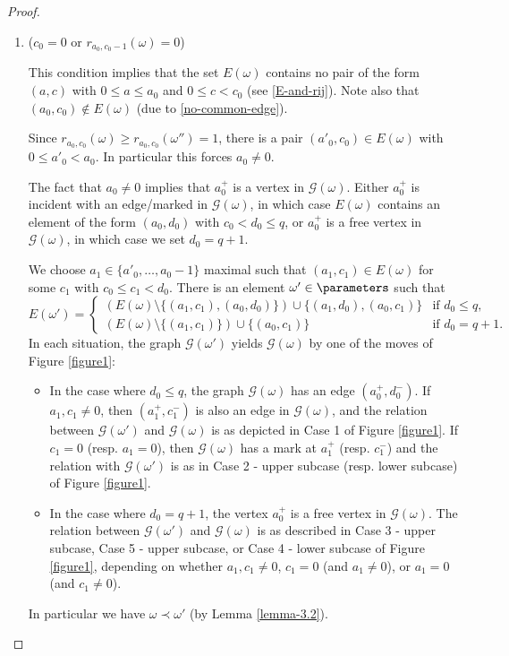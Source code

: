\begin{proof}
\begin{enumerate}[label=\textbf{Case \arabic*}]
\item ($c_0=0$ or $r_{a_0,c_0-1}(\omega)=0$)

\noindent This condition implies that the set $E(\omega)$ contains no pair of the form $(a,c)$ with $0\leq a\leq a_0$ and $0\leq c<c_0$ (see \eqref{E-and-rij}).
Note also that $(a_0,c_0)\notin E(\omega)$ (due to \eqref{no-common-edge}).

Since $r_{a_0,c_0}(\omega)\geq r_{a_0,c_0}(\omega'')=1$, there is a pair $(a'_0,c_0)\in E(\omega)$ with $0\leq a'_0< a_0$.
In particular this forces $a_0\not=0$.

The fact that $a_0\not=0$ implies that $a_0^+$ is a vertex in $\mathcal{G}(\omega)$. Either $a_0^+$ is incident with an edge/marked in $\mathcal{G}(\omega)$, in which case $E(\omega)$ contains an element of the form $(a_0,d_0)$ with $c_0< d_0\leq q$, or $a_0^+$ is a free vertex in $\mathcal{G}(\omega)$, in which case we set $d_0=q+1$.

We choose $a_1\in\{a'_0,\ldots,a_0-1\}$ maximal such that $(a_1,c_1)\in E(\omega)$ for some $c_1$ with $c_0\leq c_1<d_0$.
There is an element
$\omega'\in\parameters$ such that
\[
E(\omega')=\left\{\begin{array}{ll}
(E(\omega)\setminus\{(a_1,c_1),(a_0,d_0)\})\cup\{(a_1,d_0),(a_0,c_1)\} & \mbox{if $d_0\leq q$},\\
(E(\omega)\setminus\{(a_1,c_1)\})\cup\{(a_0,c_1)\} & \mbox{if $d_0=q+1$}.
\end{array}
\right.
\]
In each situation, the graph $\mathcal{G}(\omega')$ yields $\mathcal{G}(\omega)$ by one of the moves of Figure \ref{figure1}:
\begin{itemize}
\item In the case where $d_0\leq q$,
the graph $\mathcal{G}(\omega)$ has an edge $(a_0^+,d_0^-)$. If
$a_1,c_1\not=0$, then $(a_1^+,c_1^-)$ is also an edge in
$\mathcal{G}(\omega)$, and the relation between
$\mathcal{G}(\omega')$ and $\mathcal{G}(\omega)$ is as depicted in
Case 1 of Figure \ref{figure1}. If $c_1=0$ (resp. $a_1=0$), then
$\mathcal{G}(\omega)$ has a mark at $a_1^+$ (resp. $c_1^-$) and the
relation with $\mathcal{G}(\omega')$ is as in Case 2 - upper subcase
(resp. lower subcase) of Figure \ref{figure1}.
\item In the case where $d_0=q+1$, the vertex $a_0^+$ is a free vertex in $\mathcal{G}(\omega)$. The relation between $\mathcal{G}(\omega')$ and $\mathcal{G}(\omega)$ is as described in Case 3 - upper subcase, Case 5 - upper subcase, or Case 4 - lower subcase of Figure \ref{figure1}, depending on whether
$a_1,c_1\not=0$, $c_1=0$ (and $a_1\not=0$), or $a_1=0$ (and $c_1\not=0$).
\end{itemize}
In particular we have $\omega\prec\omega'$ (by Lemma \ref{lemma-3.2}).


\end{enumerate}
\end{proof}
